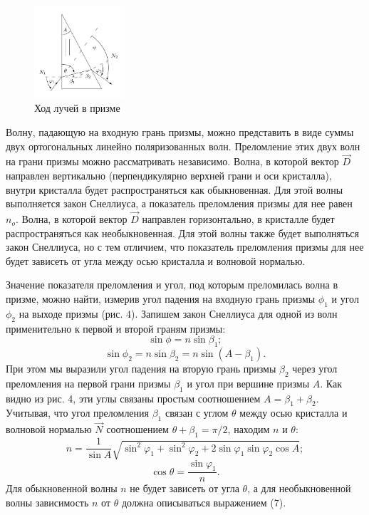 \documentclass[a4paper, 12pt]{article}%
\begin{document}
\begin{figure}[H]
	\begin{center}
		\includegraphics[width=0.3\textwidth]{prism.png}
		\caption{Ход лучей в призме}
		\label{1}
	\end{center}
\end{figure}
	Волну, падающую на входную грань призмы, можно представить в виде суммы двух ортогональных линейно поляризованных волн. Преломление этих двух волн на грани призмы можно рассматривать независимо. Волна, в которой вектор $\vec D$ направлен вертикально (перпендикулярно верхней грани и оси кристалла), внутри кристалла будет распространяться как обыкновенная. Для этой волны выполняется закон Снеллиуса, а показатель преломления призмы для нее равен $n_o$. Волна, в которой вектор $\vec D$ направлен горизонтально, в кристалле будет распространяться как необыкновенная. Для этой волны также будет выполняться закон Снеллиуса, но с тем отличием, что показатель преломления призмы для нее будет зависеть от угла между осью кристалла и волновой нормалью. 
	
	Значение показателя преломления и угол, под которым преломилась волна в призме, можно найти, измерив угол падения на входную грань призмы $\phi_1$ и угол $\phi_2$ на выходе призмы (рис. 4). Запишем закон Снеллиуса для одной из волн применительно к первой и второй граням призмы:
	\[
	\sin \phi = n \sin \beta_1;
	\]
	\[
	\sin \phi_2 = n \sin \beta_2 = n \sin (A - \beta_1).
	\]
	При этом мы выразили угол падения на вторую грань призмы $\beta_2$ через угол преломления на первой грани призмы $\beta_1$ и угол при вершине призмы $A$. Как видно из рис. 4, эти углы связаны простым соотношением $A = \beta_1 + \beta_2$. Учитывая, что угол преломления $\beta_1$ связан с углом $\theta$ между осью кристалла и волновой нормалью $\vec N$ соотношением $\theta + \beta_1 = \pi / 2$, находим $n$ и $\theta$:
	\begin{equation}
		n = \frac{1}{\sin A} \sqrt{\sin^2 \varphi_1 + \sin^2 \varphi_2 + 2 \sin \varphi_1 \sin \varphi_2 \cos A};
	\end{equation}
	\[
	\cos \theta = \frac{\sin \varphi_1}{n}.
	\]
	Для обыкновенной волны $n$ не будет зависеть от угла $\theta$, а для необыкновенной волны зависимость $n$ от $\theta$ должна описываться выражением (7).
	
\end{document}
